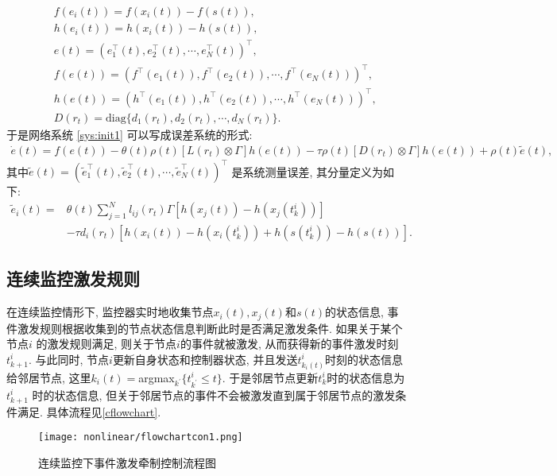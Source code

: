         \begin{eqnarray*}
        &&f(e_{i}(t))=f(x_{i}(t))-f(s(t)),\\
        &&h(e_{i}(t))=h(x_{i}(t))-h(s(t)),\\
        &&e(t)=(e^\top_{1}(t),e^\top_{2}(t),\cdots,e^\top_{N}(t))^\top,\\
        &&f(e(t))=(f^\top(e_{1}(t)),f^\top(e_{2}(t)),\cdots,f^\top(e_{N}(t)))^\top,\\
        &&h(e(t))=(h^\top(e_{1}(t)),h^\top(e_{2}(t)),\cdots,h^\top(e_{N}(t)))^\top,\\
        &&D(r_{t})=\text{diag}\{d_{1}(r_{t}),d_{2}(r_{t}),\cdots,d_{N}(r_{t})\}.
        \end{eqnarray*}
       于是网络系统 \eqref{sys:init1} 可以写成误差系统的形式:
        \begin{align}\label{sys:all}
        \dot{e}(t)=f(e(t))-\theta(t)\rho(t)[L(r_{t})\otimes\Gamma]h(e(t))-\tau \rho(t)[D(r_{t})\otimes\Gamma] h(e(t))+\rho(t)\tilde{e}(t),
        \end{align}
       其中$\tilde{e}(t)=(\tilde{e}^\top_{1}(t),\tilde{e}^\top_{2}(t),\cdots,\tilde{e}^\top_{N}(t))^\top$ 是系统测量误差, 其分量定义为如下:
        \begin{align*}
        \nonumber \tilde{e}_{i}(t)=&\theta(t)\sum^{N}_{j=1}l_{ij}(r_{t})\Gamma[h(x_{j}(t))-h(x_{j}(t_{k}^{i}))]\\
        &-\tau d_{i}(r_{t})[h(x_{i}(t))-h(x_{i}(t_{k}^{i}))+h(s(t_{k}^{i}))-h(s(t))].
        \end{align*}
\subsection{连续监控激发规则}
    在连续监控情形下, 监控器实时地收集节点$x_i(t), x_j(t)$和$s(t)$的状态信息, 事件激发规则根据收集到的节点状态信息判断此时是否满足激发条件. 如果关于某个节点$i$ 的激发规则满足, 则关于节点$i$的事件就被激发, 从而获得新的事件激发时刻$t^{i}_{k+1}$. 与此同时, 节点$i$更新自身状态和控制器状态, 并且发送$t^i_{k_i(t)}$时刻的状态信息给邻居节点, 这里$k_{i}(t)=$argmax$_{k^{'}}\{t^{i}_{k^{'}}\leq t\}$. 于是邻居节点更新$t^{i}_{k}$时的状态信息为$t^{i}_{k+1}$ 时的状态信息, 但关于邻居节点的事件不会被激发直到属于邻居节点的激发条件满足. 具体流程见\autoref{cflowchart}.
    \begin{figure}[!htp]
    \setlength{\abovecaptionskip}{-1cm}
     \begin{center}
           {\texttt{[image: nonlinear/flowchartcon1.png]}}
     \end{center}
  \caption{连续监控下事件激发牵制控制流程图}\label{cflowchart}
    \end{figure}

